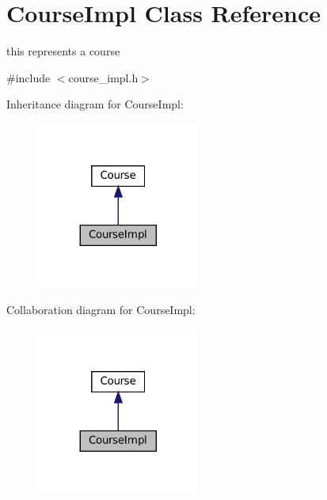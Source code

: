 \hypertarget{classCourseImpl}{}\section{Course\+Impl Class Reference}
\label{classCourseImpl}


this represents a course  




{\ttfamily \#include $<$course\+\_\+impl.\+h$>$}



Inheritance diagram for Course\+Impl\+:\nopagebreak
\begin{figure}[H]
\begin{center}
\leavevmode
\includegraphics[width=152pt]{classCourseImpl__inherit__graph}
\end{center}
\end{figure}


Collaboration diagram for Course\+Impl\+:\nopagebreak
\begin{figure}[H]
\begin{center}
\leavevmode
\includegraphics[width=152pt]{classCourseImpl__coll__graph}
\end{center}
\end{figure}
